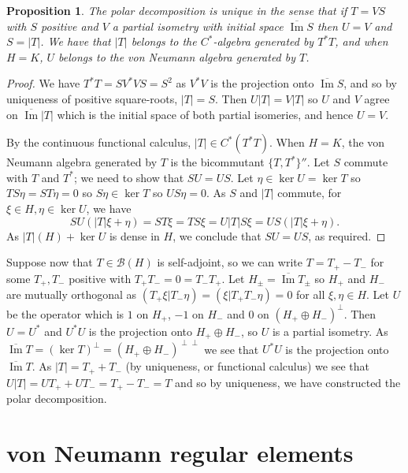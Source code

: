 \documentclass[twoside,a4paper,12pt]{article}
\theoremstyle{plain}
\newtheorem{proposition}{Proposition}[section]
\theoremstyle{definition}
\newcommand{\mc}{\mathcal}
\newcommand{\im}{\operatorname{Im}}
\begin{document}
\begin{proposition}\label{prop:polar_unique}
The polar decomposition is unique in the sense that if $T = VS$ with $S$ positive and $V$ a partial isometry with initial space $\overline{\im} S$ then $U=V$ and $S = |T|$.  We have that $|T|$ belongs to the $C^*$-algebra generated by $T^*T$, and when $H=K$, $U$ belongs to the von Neumann algebra generated by $T$.
\end{proposition}
\begin{proof}
We have $T^*T = S V^*V S = S^2$ as $V^*V$ is the projection onto $\overline{\im} S$, and so by uniqueness of positive square-roots, $|T| = S$.  Then $U|T| = V|T|$ so $U$ and $V$ agree on $\overline{\im} |T|$ which is the initial space of both partial isomeries, and hence $U=V$.

By the continuous functional calculus, $|T| \in C^*(T^*T)$.  When $H=K$, the von Neumann algebra generated by $T$ is the bicommutant $\{ T, T^* \}''$.  Let $S$ commute with $T$ and $T^*$; we need to show that $SU=US$.  Let $\eta \in \ker U = \ker T$ so $TS\eta = ST\eta = 0$ so $S\eta\in \ker T$ so $US\eta=0$.  As $S$ and $|T|$ commute, for $\xi\in H, \eta\in \ker U$, we have
\[ SU(|T|\xi+\eta) = ST\xi = TS\xi = U|T|S\xi = US(|T|\xi+\eta). \]
As $|T|(H) + \ker U$ is dense in $H$, we conclude that $SU=US$, as required.
\end{proof}

Suppose now that $T\in\mc B(H)$ is self-adjoint, so we can write $T = T_+ - T_-$ for some $T_+,T_-$ positive with $T_+ T_- = 0 = T_- T_+$.  Let $H_\pm = \overline{\im}T_\pm$ so $H_+$ and $H_-$ are mutually orthogonal as $(T_+\xi|T_-\eta) = (\xi|T_+T_-\eta) = 0$ for all $\xi,\eta\in H$.  Let $U$ be the operator which is $1$ on $H_+$, $-1$ on $H_-$ and $0$ on $(H_+ \oplus H_-)^\perp$.  Then $U = U^*$ and $U^*U$ is the projection onto $H_+ \oplus H_-$, so $U$ is a partial isometry.  As $\overline{\im}T = (\ker T)^\perp = (H_+ \oplus H_-)^{\perp\perp}$ we see that $U^*U$ is the projection onto $\overline{\im}T$.  As $|T| = T_+ + T_-$ (by uniqueness, or functional calculus) we see that $U|T| = UT_+ + UT_- = T_+ - T_- = T$ and so by uniqueness, we have constructed the polar decomposition.





\clearpage

\section{von Neumann regular elements}
\end{document}
